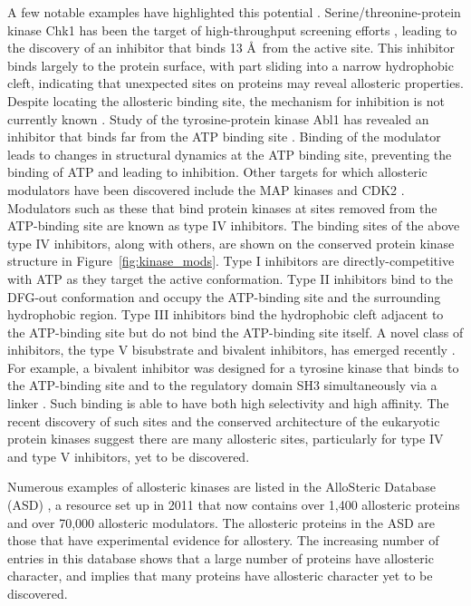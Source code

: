 A few notable examples have highlighted this potential \cite{Gavrin2013}.
Serine/threonine-protein kinase Chk1 has been the target of high-throughput screening efforts \cite{Converso2009}, leading to the discovery of an inhibitor that binds 13 \AA\ from the active site.
This inhibitor binds largely to the protein surface, with part sliding into a narrow hydrophobic cleft, indicating that unexpected sites on proteins may reveal allosteric properties.
Despite locating the allosteric binding site, the mechanism for inhibition is not currently known \cite{Vanderpool2009}.
Study of the tyrosine-protein kinase Abl1 has revealed an inhibitor that binds far from the ATP binding site \cite{Zhang2010, Yang2011}.
Binding of the modulator leads to changes in structural dynamics at the ATP binding site, preventing the binding of ATP and leading to inhibition.
Other targets for which allosteric modulators have been discovered include the MAP kinases \cite{Comess2011} and CDK2 \cite{Betzi2011}.
Modulators such as these that bind protein kinases at sites removed from the ATP-binding site are known as type IV inhibitors.
The binding sites of the above type IV inhibitors, along with others, are shown on the conserved protein kinase structure in Figure~\ref{fig:kinase_mods}.
Type I inhibitors are directly-competitive with ATP as they target the active conformation.
Type II inhibitors bind to the DFG-out conformation and occupy the ATP-binding site and the surrounding hydrophobic region.
Type III inhibitors bind the hydrophobic cleft adjacent to the ATP-binding site but do not bind the ATP-binding site itself.
A novel class of inhibitors, the type V bisubstrate and bivalent inhibitors, has emerged recently \cite{Lamba2012}.
For example, a bivalent inhibitor was designed for a tyrosine kinase that binds to the ATP-binding site and to the regulatory domain SH3 simultaneously via a linker \cite{Hill2009}.
Such binding is able to have both high selectivity and high affinity.
The recent discovery of such sites and the conserved architecture of the eukaryotic protein kinases suggest there are many allosteric sites, particularly for type IV and type V inhibitors, yet to be discovered.

Numerous examples of allosteric kinases are listed in the AlloSteric Database (ASD) \cite{Shen2016}, a resource set up in 2011 that now contains over 1,400 allosteric proteins and over 70,000 allosteric modulators.
The allosteric proteins in the ASD are those that have experimental evidence for allostery.
The increasing number of entries in this database shows that a large number of proteins have allosteric character, and implies that many proteins have allosteric character yet to be discovered.


